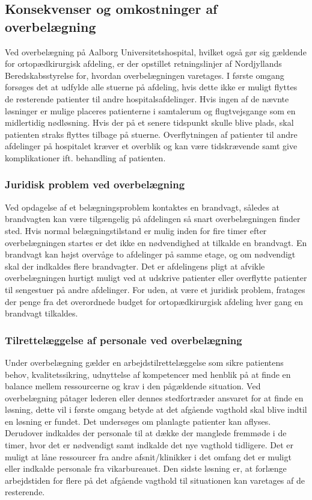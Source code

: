 \subsection{Konsekvenser og omkostninger af overbelægning}
Ved overbelægning på Aalborg Universitetshospital, hvilket også gør sig gældende for ortopædkirurgisk afdeling, er der opstillet retningslinjer af Nordjyllands Beredskabsstyrelse for, hvordan overbelægningen varetages. I første omgang forsøges det at udfylde alle stuerne på afdeling, hvis dette ikke er muligt flyttes de resterende patienter til andre hospitalsafdelinger. Hvis ingen af de nævnte løsninger er mulige placeres patienterne i samtalerum og flugtvejsgange som en midlertidig nødløsning. Hvis der på et senere tidspunkt skulle blive plads, skal patienten straks flyttes tilbage på stuerne. \cite{Beredskab2016} Overflytningen af patienter til andre afdelinger på hospitalet kræver et overblik og kan være tidskrævende samt give komplikationer ift. behandling af patienten. 

\subsubsection{Juridisk problem ved overbelægning}
Ved opdagelse af et belægningsproblem kontaktes en brandvagt, således at brandvagten kan være tilgængelig på afdelingen så snart overbelægningen finder sted. Hvis normal belægningstilstand er mulig inden for fire timer efter overbelægningen startes er det ikke en nødvendighed at tilkalde en brandvagt. En brandvagt kan højst overvåge to afdelinger på samme etage, og om nødvendigt skal der indkaldes flere brandvagter. Det er afdelingens pligt at  afvikle overbelægningen hurtigt muligt ved at udskrive patienter eller overflytte patienter til sengestuer på andre afdelinger. \cite{Beredskab2016} For uden, at være et juridisk problem, fratages der penge fra det overordnede budget for ortopædkirurgisk afdeling hver gang en brandvagt tilkaldes.


\subsubsection{Tilrettelæggelse af personale ved overbelægning}
Under overbelægning gælder en arbejdstilrettelæggelse som sikre patientens behov, kvalitetssikring, udnyttelse af kompetencer med henblik på at finde en balance mellem ressourcerne og krav i den pågældende situation. Ved overbelægning påtager lederen eller dennes stedfortræder ansvaret for at finde en løsning, dette vil i første omgang betyde at det afgående vagthold skal blive indtil en løsning er fundet. Det undersøges om planlagte patienter kan aflyses. Derudover indkaldes der personale til at dække der manglede fremmøde i de timer, hvor det er nødvendigt samt indkalde det nye vagthold tidligere. Det er muligt at låne ressourcer fra andre afsnit/klinikker i det omfang det er muligt eller indkalde personale fra vikarbureauet. Den sidste løsning er, at forlænge arbejdstiden for flere på det afgående vagthold til situationen kan varetages af de resterende. \cite{Bjerg2016}


